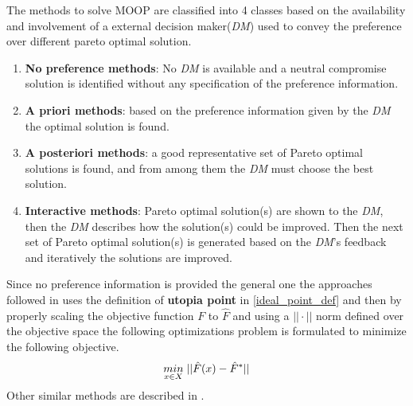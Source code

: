 The methods to solve MOOP are classified into 4 classes \cite{hwang2012multiple} based on the availability and involvement of a external decision maker(\textit{DM}) used to convey the preference over different pareto optimal solution.
\begin{enumerate}
    \item \textbf{No preference methods}: No \textit{DM} is available and a neutral compromise solution is identified without any specification of the preference information.
    \item \textbf{A priori methods}: based on the preference information given by the \textit{DM} the optimal solution is found.
    \item \textbf{A posteriori methods}: a good representative set of Pareto optimal solutions is found, and from among them the \textit{DM} must choose the best solution.
    \item \textbf{Interactive methods}: Pareto optimal solution(s) are shown to the \textit{DM}, then the \textit{DM} describes how the solution(s) could be improved. Then the next set of Pareto optimal solution(s) is generated based on the \textit{DM}'s feedback and iteratively the solutions are improved.
\end{enumerate}

Since no preference information is provided the general one the approaches followed in \cite{zeleny1973compromise} uses the definition of \textbf{utopia point} in \ref{ideal_point_def} and then by properly scaling the objective function $F$ to $\hat{F}$ and using a $||\cdot||$ norm defined over the objective space the following optimizations problem is formulated to minimize the following objective.
\begin{equation}
    \underset{x \in X}{min}\hspace{1mm} ||\hat{F}(x) - \hat{F}^{*}||
\end{equation}
\newline Other similar methods are described in \cite{miettinen1998}.

